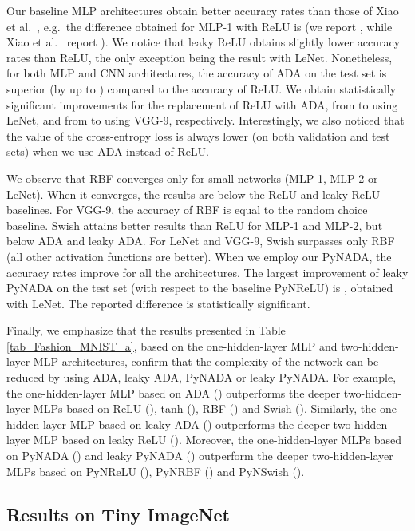 \documentclass[pdflatex,sn-mathphys]{sn-jnl}
\theoremstyle{thmstyleone}
\theoremstyle{thmstyletwo}\newtheorem{example}{Example}\newtheorem{remark}{Remark}
\theoremstyle{thmstylethree}\newtheorem{definition}{Definition}\DeclareMathOperator{\sinc}{sinc}
\begin{document}
Our baseline MLP architectures obtain better accuracy rates than those of Xiao et al.~\cite{Xiao-A-2017}, e.g.~the difference obtained for MLP-1 with ReLU is  (we report , while Xiao et al.~\cite{Xiao-A-2017} report ).
We notice that leaky ReLU obtains slightly lower accuracy rates than ReLU, the only exception being the result with LeNet. Nonetheless, for both MLP and CNN architectures, the accuracy of ADA on the test set is superior (by up to ) compared to the accuracy of ReLU. We obtain statistically significant improvements for the replacement of ReLU with ADA, from  to  using LeNet, and from  to  using VGG-9, respectively. Interestingly, we also noticed that the value of the cross-entropy loss is always lower (on both validation and test sets) when we use ADA instead of ReLU. 

We observe that RBF converges only for small networks (MLP-1, MLP-2 or LeNet). When it converges, the results are below the ReLU and leaky ReLU baselines. For VGG-9, the accuracy of RBF is equal to the random choice baseline. Swish attains better results than ReLU for MLP-1 and MLP-2, but below ADA and leaky ADA. For LeNet and VGG-9, Swish surpasses only RBF (all other activation functions are better). When we employ our PyNADA, the accuracy rates improve for all the architectures. The largest improvement of leaky PyNADA on the test set (with respect to the baseline PyNReLU) is , obtained with LeNet. The reported difference is statistically significant. 



Finally, we emphasize that the results presented in Table \ref{tab_Fashion_MNIST_a}, based on the one-hidden-layer MLP and two-hidden-layer MLP architectures, confirm that the complexity of the network can be reduced by using ADA, leaky ADA, PyNADA or leaky PyNADA. For example, the one-hidden-layer MLP based on ADA () outperforms the deeper two-hidden-layer MLPs based on ReLU (), tanh (), RBF () and Swish (). Similarly, the one-hidden-layer MLP based on leaky ADA () outperforms the deeper two-hidden-layer MLP based on leaky ReLU (). Moreover, the one-hidden-layer MLPs based on PyNADA () and leaky PyNADA () outperform the deeper two-hidden-layer MLPs based on PyNReLU (), PyNRBF () and PyNSwish ().

\subsection{Results on Tiny ImageNet}
\label{sec_results_tiny}
\end{document}
